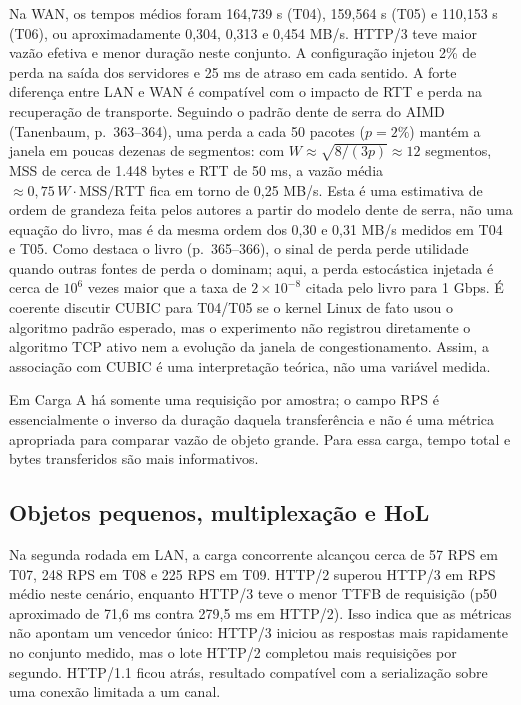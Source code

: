 \documentclass[12pt,a4paper]{article}
\begin{document}
Na WAN, os tempos médios foram 164,739 s (T04), 159,564 s (T05) e 110,153 s (T06), ou
aproximadamente 0,304, 0,313 e 0,454 MB/s. HTTP/3 teve maior vazão efetiva e menor duração
neste conjunto. A configuração injetou 2\% de perda na saída dos servidores e 25 ms de atraso
em cada sentido. A forte diferença entre LAN e WAN é compatível com o impacto de RTT e perda
na recuperação de transporte. Seguindo o padrão dente de serra do AIMD (Tanenbaum,
p.~363--364), uma perda a cada 50 pacotes ($p=2\%$) mantém a janela em poucas dezenas de
segmentos: com $W\approx\sqrt{8/(3p)}\approx 12$ segmentos, MSS de cerca de 1.448 bytes e
RTT de 50 ms, a vazão média $\approx 0{,}75\,W\cdot\mathrm{MSS}/\mathrm{RTT}$ fica em torno de
0,25 MB/s. Esta é uma estimativa de ordem de grandeza feita pelos autores a partir do modelo
dente de serra, não uma equação do livro, mas é da mesma ordem dos 0,30 e 0,31 MB/s medidos
em T04 e T05. Como destaca o livro (p.~365--366), o sinal de perda perde utilidade quando
outras fontes de perda o dominam; aqui, a perda estocástica injetada é cerca de $10^{6}$ vezes
maior que a taxa de $2\times10^{-8}$ citada pelo livro para 1 Gbps. É coerente discutir CUBIC
para T04/T05 se o kernel Linux de fato usou o algoritmo padrão esperado, mas o experimento não
registrou diretamente o algoritmo TCP ativo nem a evolução da janela de congestionamento.
Assim, a associação com CUBIC é uma interpretação teórica, não uma variável medida.

Em Carga A há somente uma requisição por amostra; o campo RPS é essencialmente o inverso
da duração daquela transferência e não é uma métrica apropriada para comparar vazão de
objeto grande. Para essa carga, tempo total e bytes transferidos são mais informativos.

\subsection{Objetos pequenos, multiplexação e HoL}

Na segunda rodada em LAN, a carga concorrente alcançou cerca de 57 RPS em T07, 248 RPS em
T08 e 225 RPS em T09. HTTP/2 superou HTTP/3 em RPS médio neste cenário, enquanto HTTP/3
teve o menor TTFB de requisição (p50 aproximado de 71,6 ms contra 279,5 ms em HTTP/2).
Isso indica que as métricas não apontam um vencedor único: HTTP/3 iniciou as respostas mais
rapidamente no conjunto medido, mas o lote HTTP/2 completou mais requisições por segundo.
HTTP/1.1 ficou atrás, resultado compatível com a serialização sobre uma conexão limitada a
um canal.
\end{document}

